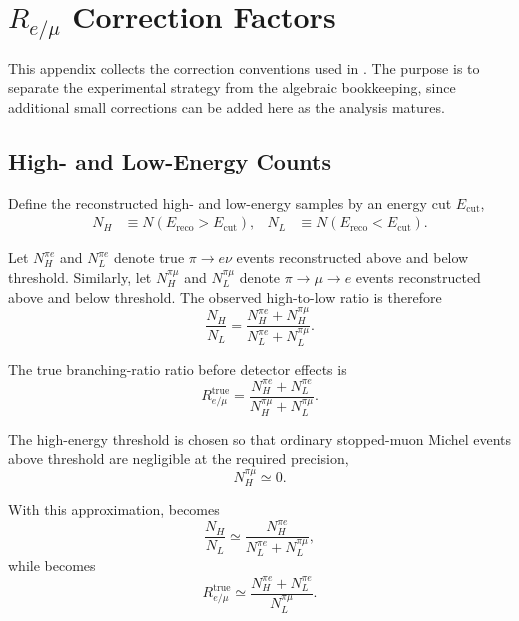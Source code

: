 \section{\texorpdfstring{\(R_{e/\mu}\) Correction Factors}{Re/mu Correction Factors}}
\label{sec:remu-corrections}

This appendix collects the correction conventions used in
. The purpose is to separate the experimental
strategy from the algebraic bookkeeping, since additional small corrections can
be added here as the analysis matures.

\subsection{High- and Low-Energy Counts}
\label{subsec:remu-high-low-counts}

Define the reconstructed high- and low-energy samples by an energy cut
\(E_{\mathrm{cut}}\),
\begin{align}
  N_H &\equiv N(E_{\mathrm{reco}}>E_{\mathrm{cut}}), &
  N_L &\equiv N(E_{\mathrm{reco}}<E_{\mathrm{cut}}).
\end{align}

Let \(N_H^{\pi e}\) and \(N_L^{\pi e}\) denote true
\(\pi\to e\nu\) events reconstructed above and below threshold. Similarly,
let \(N_H^{\pi\mu}\) and \(N_L^{\pi\mu}\) denote
\(\pi\to\mu\to e\) events reconstructed above and below threshold. The observed
high-to-low ratio is therefore
\begin{equation}
  \frac{N_H}{N_L}
  =
  \frac{N_H^{\pi e}+N_H^{\pi\mu}}
       {N_L^{\pi e}+N_L^{\pi\mu}} .
  \label{eq:observed-high-low-ratio}
\end{equation}

The true branching-ratio ratio before detector effects is
\begin{equation}
  R_{e/\mu}^{\mathrm{true}}
  =
  \frac{N_H^{\pi e}+N_L^{\pi e}}
       {N_H^{\pi\mu}+N_L^{\pi\mu}} .
  \label{eq:true-remu-counts}
\end{equation}

The high-energy threshold is chosen so that ordinary stopped-muon Michel events
above threshold are negligible at the required precision,
\begin{equation}
  N_H^{\pi\mu} \simeq 0 .
  \label{eq:negligible-muon-leakage}
\end{equation}

With this approximation,
 becomes
\begin{equation}
  \frac{N_H}{N_L}
  \simeq
  \frac{N_H^{\pi e}}
       {N_L^{\pi e}+N_L^{\pi\mu}},
  \label{eq:observed-ratio-tail-approx}
\end{equation}
while  becomes
\begin{equation}
  R_{e/\mu}^{\mathrm{true}}
  \simeq
  \frac{N_H^{\pi e}+N_L^{\pi e}}
       {N_L^{\pi\mu}} .
  \label{eq:true-ratio-tail-approx}
\end{equation}

